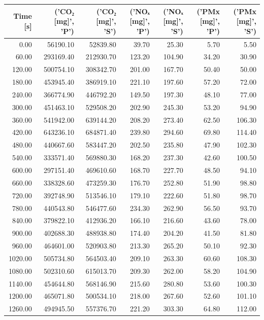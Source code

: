 \begin{tabular}{r|rr|rr|rr|}
\toprule
Time [s] & ('CO₂ [mg]', 'P') & ('CO₂ [mg]', 'S') & ('NOₓ [mg]', 'P') & ('NOₓ [mg]', 'S') & ('PMx [mg]', 'P') & ('PMx [mg]', 'S') \\
\midrule
0.00 & 56190.10 & 52839.80 & 39.70 & 25.30 & 5.70 & 5.50 \\
60.00 & 293169.40 & 212930.70 & 123.20 & 104.90 & 34.20 & 30.90 \\
120.00 & 500754.10 & 308342.70 & 201.00 & 167.70 & 50.40 & 50.00 \\
180.00 & 453945.40 & 386919.10 & 221.10 & 197.60 & 57.20 & 72.00 \\
240.00 & 366774.90 & 446792.20 & 149.50 & 197.30 & 48.10 & 77.00 \\
300.00 & 451463.10 & 529508.20 & 202.90 & 245.30 & 53.20 & 94.90 \\
360.00 & 541942.00 & 639144.20 & 208.20 & 273.40 & 62.50 & 106.30 \\
420.00 & 643236.10 & 684871.40 & 239.80 & 294.60 & 69.80 & 114.40 \\
480.00 & 440667.60 & 583447.20 & 202.50 & 235.80 & 47.90 & 102.30 \\
540.00 & 333571.40 & 569880.30 & 168.20 & 237.30 & 42.60 & 100.50 \\
600.00 & 297151.40 & 469610.60 & 168.70 & 227.70 & 48.50 & 94.10 \\
660.00 & 338328.60 & 473259.30 & 176.70 & 252.80 & 51.90 & 98.80 \\
720.00 & 392748.90 & 513546.10 & 179.10 & 222.60 & 51.80 & 98.70 \\
780.00 & 440543.80 & 546477.60 & 234.30 & 262.90 & 56.50 & 93.70 \\
840.00 & 379822.10 & 412936.20 & 166.10 & 216.60 & 43.60 & 78.00 \\
900.00 & 402688.30 & 488938.80 & 174.40 & 204.20 & 41.50 & 81.80 \\
960.00 & 464601.00 & 520903.80 & 213.30 & 265.20 & 50.10 & 92.30 \\
1020.00 & 505734.80 & 564503.40 & 209.10 & 263.30 & 60.60 & 108.30 \\
1080.00 & 502310.60 & 615013.70 & 209.30 & 262.00 & 58.20 & 104.90 \\
1140.00 & 454644.80 & 568146.90 & 215.60 & 280.80 & 53.60 & 100.30 \\
1200.00 & 465071.80 & 500534.10 & 218.00 & 267.60 & 52.60 & 101.10 \\
1260.00 & 494945.50 & 557376.70 & 221.20 & 303.30 & 64.80 & 112.00 \\

\end{tabular}

